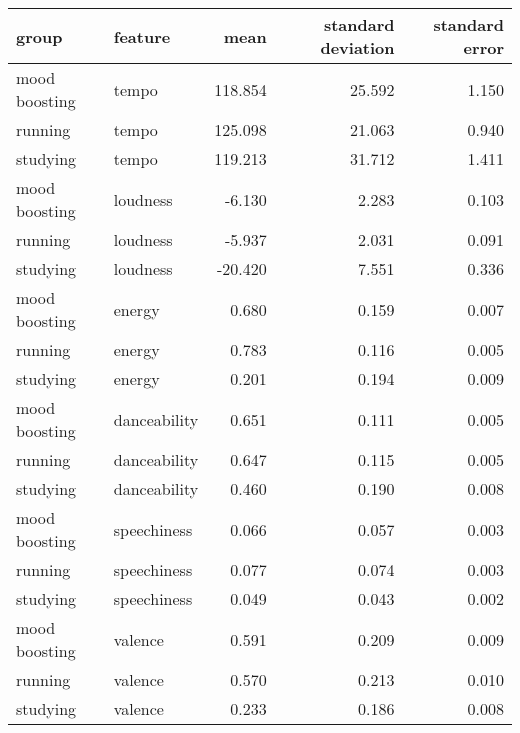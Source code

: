 \begin{tabular}{llrrr}
\toprule
        group &      feature &    mean &  standard deviation &  standard error \\
\midrule
mood boosting &        tempo & 118.854 &              25.592 &           1.150 \\
      running &        tempo & 125.098 &              21.063 &           0.940 \\
     studying &        tempo & 119.213 &              31.712 &           1.411 \\
mood boosting &     loudness &  -6.130 &               2.283 &           0.103 \\
      running &     loudness &  -5.937 &               2.031 &           0.091 \\
     studying &     loudness & -20.420 &               7.551 &           0.336 \\
mood boosting &       energy &   0.680 &               0.159 &           0.007 \\
      running &       energy &   0.783 &               0.116 &           0.005 \\
     studying &       energy &   0.201 &               0.194 &           0.009 \\
mood boosting & danceability &   0.651 &               0.111 &           0.005 \\
      running & danceability &   0.647 &               0.115 &           0.005 \\
     studying & danceability &   0.460 &               0.190 &           0.008 \\
mood boosting &  speechiness &   0.066 &               0.057 &           0.003 \\
      running &  speechiness &   0.077 &               0.074 &           0.003 \\
     studying &  speechiness &   0.049 &               0.043 &           0.002 \\
mood boosting &      valence &   0.591 &               0.209 &           0.009 \\
      running &      valence &   0.570 &               0.213 &           0.010 \\
     studying &      valence &   0.233 &               0.186 &           0.008 \\
\bottomrule
\end{tabular}
